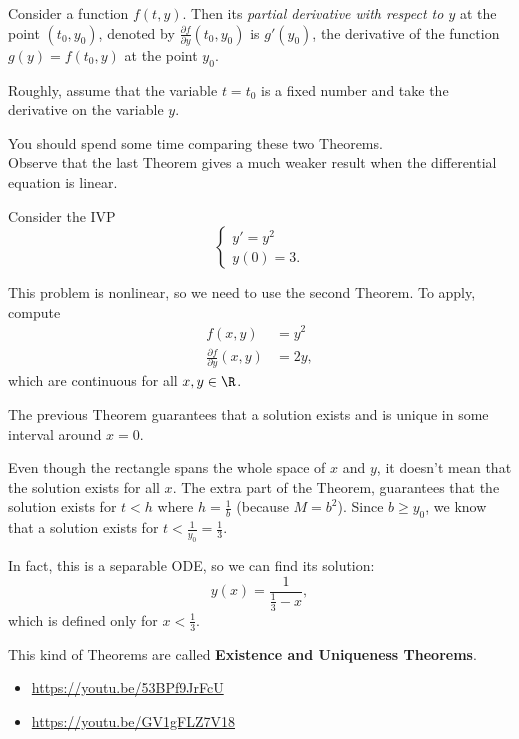 \begin{definition}
	Consider a function $f(t,y)$. Then its \emph{partial derivative with respect to $y$} at the point $(t_0,y_0)$, denoted by $\frac{\partial f}{\partial y}(t_0,y_0)$ is $g'(y_0)$, the derivative of the function $g(y)=f(t_0,y)$ at the point $y_0$.
	
	Roughly, assume that the variable $t=t_0$ is a fixed number and take the derivative on the variable $y$.
\end{definition}


You should spend some time comparing these two Theorems. \\


Observe that the last Theorem gives a much weaker result when the differential equation is linear.


\begin{example}
Consider the IVP
$$
\begin{cases}
y'=y^2\\
y(0)=3.
\end{cases}
$$

This problem is nonlinear, so we need to use the second Theorem. To apply, compute
\begin{align*}
f(x,y) & = y^2 \\
\frac{\partial f}{\partial y}(x,y) & = 2y,
\end{align*}
which are continuous for all $x,y\in \R$.

The previous Theorem guarantees that a solution exists and is unique in some interval around $x=0$.

Even though the rectangle spans the whole space of $x$ and $y$, it doesn't mean that the solution exists for all $x$. The extra part of the Theorem, guarantees that the solution exists for $t<h$ where $h = \frac1b$ (because $M=b^2$). Since $b \geq y_0$, we know that a solution exists for $t < \frac{1}{y_0} = \frac13$.

In fact, this is a separable ODE, so we can find its solution:
$$
y(x) = \frac{1}{\frac13-x},
$$
which is defined only for $x<\frac13$.
\end{example}


\begin{graybox}
This kind of Theorems are called \textbf{\color{gray}Existence and Uniqueness Theorems}.
\end{graybox}



\begin{video}
\begin{itemize}
	\item \href{https://youtu.be/53BPf9JrFcU}{https://youtu.be/53BPf9JrFcU} \hfill {}
	\item \href{https://youtu.be/GV1gFLZ7V18}{https://youtu.be/GV1gFLZ7V18} \hfill {}
\end{itemize}	
\end{video}


